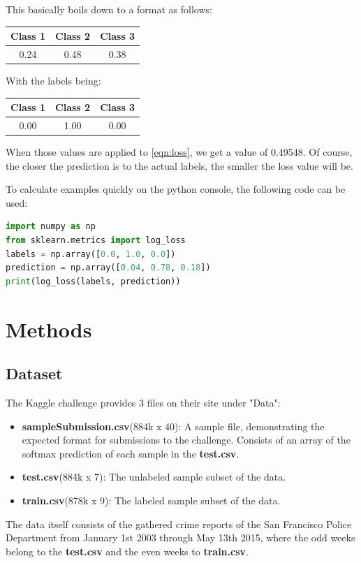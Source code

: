 \documentclass[12pt,a4paper]{scrartcl}
\begin{document}
This basically boils down to a format as follows:

\begin{center}
\begin{tabular}{c|c|c}
Class 1 & Class 2 & Class 3\\\hline
0.24 & 0.48 & 0.38
\end{tabular}
\end{center}

With the labels being:

\begin{center}
\begin{tabular}{c|c|c}
Class 1 & Class 2 & Class 3\\\hline
0.00 & 1.00 & 0.00
\end{tabular}
\end{center}

When those values are applied to \ref{eqn:loss}, we get a value of 0.49548. Of course, the closer the prediction is to the actual labels, the smaller the loss value will be.

To calculate examples quickly on the python console, the following code can be used:
\begin{lstlisting}[language=python,otherkeywords={as},label=lst:loglosscalculation,caption={Quick Log Loss Calculation in python}]
import numpy as np
from sklearn.metrics import log_loss
labels = np.array([0.0, 1.0, 0.0])
prediction = np.array([0.04, 0.78, 0.18])
print(log_loss(labels, prediction))
\end{lstlisting}


\pagebreak
\section{Methods}\label{s:methods}
\subsection{Dataset}\label{ss:dataset}
The Kaggle challenge \citep{kgl_sf_crime} provides 3 files on their site under "Data":
\begin{itemize}
\item \textbf{sampleSubmission.csv}(884k x 40): A sample file, demonstrating the expected format for submissions to the challenge. Consists of an array of the softmax prediction of each sample in the \textbf{test.csv}.
\item \textbf{test.csv}(884k x 7): The unlabeled sample subset of the data.
\item \textbf{train.csv}(878k x 9): The labeled sample subset of the data.
\end{itemize}
The data itself consists of the gathered crime reports of the San Francisco Police Department from January 1st 2003 through May 13th 2015, where the odd weeks belong to the \textbf{test.csv} and the even weeks to \textbf{train.csv}.
\end{document}
